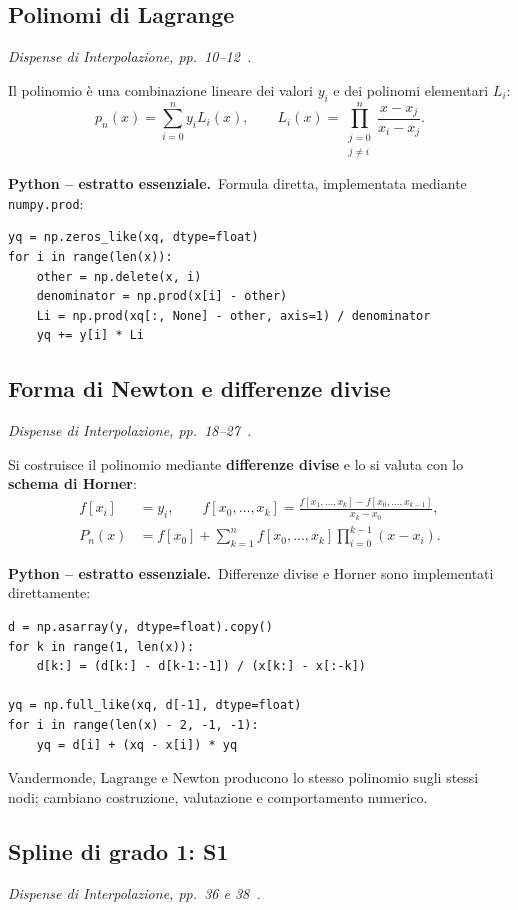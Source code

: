 \documentclass[11pt,a4paper]{article}
\newcommand{\slides}[1]{\textit{Dispense di Interpolazione, pp.~#1~\cite{dispense}.}}
\newcommand{\python}{\textbf{Python -- estratto essenziale.}}
\numberwithin{equation}{section}
\begin{document}
\subsection{Polinomi di Lagrange}
\slides{10--12}

Il polinomio è una combinazione lineare dei valori $y_i$ e dei polinomi
elementari $L_i$:
\begin{equation}
 p_n(x)=\sum_{i=0}^{n}y_iL_i(x),\qquad
 L_i(x)=\prod_{\substack{j=0\\j\ne i}}^{n}\frac{x-x_j}{x_i-x_j}.
\end{equation}

\python\ Formula diretta, implementata mediante \texttt{numpy.prod}:
\begin{lstlisting}
yq = np.zeros_like(xq, dtype=float)
for i in range(len(x)):
    other = np.delete(x, i)
    denominator = np.prod(x[i] - other)
    Li = np.prod(xq[:, None] - other, axis=1) / denominator
    yq += y[i] * Li
\end{lstlisting}

\subsection{Forma di Newton e differenze divise}
\slides{18--27}

Si costruisce il polinomio mediante \textbf{differenze divise} e lo si
valuta con lo \textbf{schema di Horner}:
\begin{align}
 f[x_i]&=y_i,\qquad
 f[x_0,\ldots,x_k]=
 \frac{f[x_1,\ldots,x_k]-f[x_0,\ldots,x_{k-1}]}{x_k-x_0},\\
 P_n(x)&=f[x_0]+\sum_{k=1}^{n}f[x_0,\ldots,x_k]
 \prod_{i=0}^{k-1}(x-x_i).
\end{align}

\python\ Differenze divise e Horner sono implementati direttamente:
\begin{lstlisting}
d = np.asarray(y, dtype=float).copy()
for k in range(1, len(x)):
    d[k:] = (d[k:] - d[k-1:-1]) / (x[k:] - x[:-k])

yq = np.full_like(xq, d[-1], dtype=float)
for i in range(len(x) - 2, -1, -1):
    yq = d[i] + (xq - x[i]) * yq
\end{lstlisting}

Vandermonde, Lagrange e Newton producono lo stesso polinomio sugli stessi
nodi; cambiano costruzione, valutazione e comportamento numerico.

\subsection{Spline di grado 1: S1}
\slides{36 e 38}
\end{document}
